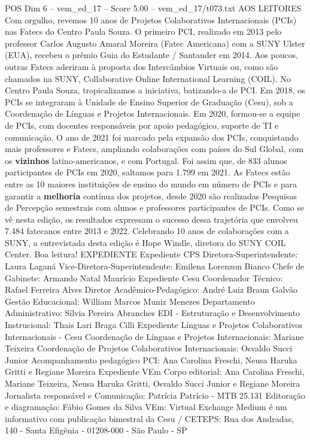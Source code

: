 \begin{textsample}{POS Dim 6 – vem\_ed\_17 – Score 5.00 – vem\_ed\_17/t073.txt}  \label{ex:f6_pos_039}
AOS LEITORES Com orgulho, revemos 10 anos de Projetos Colaborativos Internacionais (PCIs) nas Fatecs do Centro Paula Souza.
O primeiro PCI, realizado em 2013 pelo professor Carlos Augusto Amaral Moreira (Fatec Americana) com a SUNY Ulster (EUA), recebeu o prêmio Guia do Estudante / Santander em 2014.
Aos poucos, outras Fatecs aderiram à proposta dos Intercâmbios Virtuais ou, como são chamados na SUNY, Collaborative Online International Learning (COIL).
No Centro Paula Souza, tropicalizamos a iniciativa, batizando-a de PCI.
Em 2018, os PCIs se integraram à Unidade de Ensino Superior de Graduação (Cesu), sob a Coordenação de Línguas e Projetos Internacionais.
Em 2020, formou-se a equipe de PCIs, com docentes responsáveis por apoio pedagógico, suporte de TI e comunicação.
O ano de 2021 foi marcado pela expansão dos PCIs, conquistando mais professores e Fatecs, ampliando colaborações com países do Sul Global, com os \textbf{vizinhos} latino-americanos, e com Portugal.
Foi assim que, de 833 alunos participantes de PCIs em 2020, saltamos para 1.799 em 2021.
As Fatecs estão entre as 10 maiores instituições de ensino do mundo em número de PCIs e para garantir a \textbf{melhoria} contínua dos projetos, desde 2020 são realizadas Pesquisas de Percepção semestrais com alunos e professores participantes de PCIs.
Como se vê nesta edição, os resultados expressam o sucesso dessa trajetória que envolveu 7.484 fatecanos entre 2013 e 2022.
Celebrando 10 anos de colaborações com a SUNY, a entrevistada desta edição é Hope Windle, diretora do SUNY COIL Center.
Boa leitura!
EXPEDIENTE Expediente CPS Diretora-Superintendente: Laura Laganá Vice-Diretora-Superintendente: Emilena Lorenzon Bianco Chefe de Gabinete: Armando Natal Maurício Expediente Cesu Coordenador Técnico: Rafael Ferreira Alves Diretor Acadêmico-Pedagógico: André Luiz Braun Galvão Gestão Educacional: William Marcos Muniz Menezes Departamento Administrativo: Sílvia Pereira Abranches EDI - Estruturação e Desenvolvimento Instrucional: Thais Lari Braga Cilli Expediente Línguas e Projetos Colaborativos Internacionais - Cesu Coordenação de Línguas e Projetos Internacionais: Mariane Teixeira Coordenação de Projetos Colaborativos Internacionais: Osvaldo Succi Junior Acompanhamento pedagógico PCI: Ana Carolina Freschi, Neusa Haruka Gritti e Regiane Moreira Expediente VEm Corpo editorial: Ana Carolina Freschi, Mariane Teixeira, Neusa Haruka Gritti, Osvaldo Succi Junior e Regiane Moreira Jornalista responsável e Comunicação: Patrícia Patrício - MTB 25.131 Editoração e diagramação: Fábio Gomes da Silva VEm: Virtual Exchange Medium é um informativo com publicação bimestral da Cesu / CETEPS: Rua dos Andradas, 140 - Santa Efigênia - 01208-000 - São Paulo - SP

\end{textsample}
